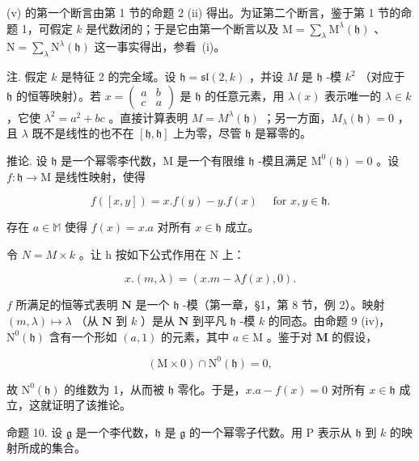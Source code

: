 (v) 的第一个断言由第 1 节的命题 2 (ii) 得出。为证第二个断言，鉴于第 1 节的命题 1，可假定 \(k\) 是代数闭的；于是它由第一个断言以及 \(\mathrm{M} = \sum_{\lambda} \mathrm{M}^{\lambda}(\mathfrak{h})\) 、\(\mathrm{N} = \sum_{\lambda} \mathrm{N}^{\lambda}(\mathfrak{h})\) 这一事实得出，参看~(i)。

注. 假定 \(k\) 是特征 2 的完全域。设 \(\mathfrak{h} = \mathfrak{sl}(2, k)\) ，并设 \(M\) 是 \(\mathfrak{h}\) -模 \(k^2\) （对应于 \(\mathfrak{h}\) 的恒等映射）。若 \(x = \begin{pmatrix} a & b \\ c & a \end{pmatrix}\) 是 \(\mathfrak{h}\) 的任意元素，用 \(\lambda(x)\) 表示唯一的 \(\lambda \in k\) ，它使 \(\lambda^2 = a^2 + bc\) 。直接计算表明 \(M = M^\lambda(\mathfrak{h})\) ；另一方面，\(M_\lambda(\mathfrak{h}) = 0\) ，且 \(\lambda\) 既不是线性的也不在 \([\mathfrak{h}, \mathfrak{h}]\) 上为零，尽管 \(\mathfrak{h}\) 是幂零的。

推论. 设 \(\mathfrak{h}\) 是一个幂零李代数，M 是一个有限维 \(\mathfrak{h}\) -模且满足 \(\mathrm{M}^0 (\mathfrak{h}) = 0\) 。设 \(f:\mathfrak{h}\to \mathrm{M}\) 是线性映射，使得

\[
f ([ x, y ]) = x. f (y) - y. f (x) \quad \text { for } x, y \in \mathfrak {h}.
\]

存在 \(a \in \mathbb{M}\) 使得 \(f(x) = x.a\) 对所有 \(x \in \mathfrak{h}\) 成立。

令 \(N = M \times k\) 。让 h 按如下公式作用在 N 上：

\[
x. (m, \lambda) = (x. m - \lambda f (x), 0).
\]

\(f\) 所满足的恒等式表明 \(\mathbf{N}\) 是一个 \(\mathfrak{h}\) -模（第一章，§1，第 8 节，例 2）。映射 \((m, \lambda) \mapsto \lambda\) （从 \(\mathbf{N}\) 到 \(k\) ）是从 \(\mathbf{N}\) 到平凡 \(\mathfrak{h}\) -模 \(k\) 的同态。由命题 9 (iv)，\(\mathrm{N}^0(\mathfrak{h})\) 含有一个形如 \((a, 1)\) 的元素，其中 \(a \in \mathrm{M}\) 。鉴于对 \(\mathbf{M}\) 的假设，

\[
(\mathrm{M} \times 0) \cap \mathrm{N} ^ {0} (\mathfrak {h}) = 0,
\]

故 \(\mathrm{N}^0 (\mathfrak{h})\) 的维数为 1，从而被 \(\mathfrak{h}\) 零化。于是，\(x.a - f(x) = 0\) 对所有 \(x\in \mathfrak{h}\) 成立，这就证明了该推论。

命题 10. 设 \(\mathfrak{g}\) 是一个李代数，\(\mathfrak{h}\) 是 \(\mathfrak{g}\) 的一个幂零子代数。用 P 表示从 \(\mathfrak{h}\) 到 \(k\) 的映射所成的集合。

